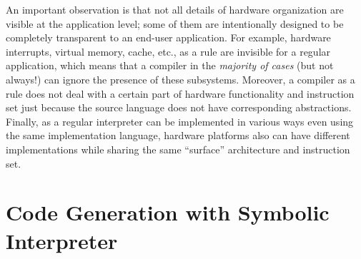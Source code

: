 An important observation is that not all details of hardware organization are visible at the application level; some of them are intentionally
designed to be completely transparent to an end-user application. For example, hardware interrupts, virtual memory, cache, etc., as a rule are
invisible for a regular application, which means that a compiler in the \emph{majority of cases} (but not always!) can ignore the presence of
these subsystems. Moreover, a compiler as a rule does not deal with a certain part of hardware functionality and instruction set just
because the source language does not have corresponding abstractions. Finally, as a regular interpreter can be implemented in
various ways even using the same implementation language, hardware platforms also can have different implementations while sharing
the same ``surface'' architecture and instruction set. 







\section{Code Generation with Symbolic Interpreter}

\section{}


